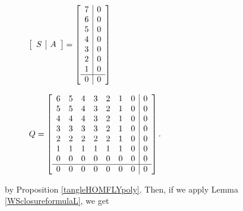 \documentclass[11pt]{amsart}
\theoremstyle{plain}
\theoremstyle{definition}
\theoremstyle{remark}
\begin{document}
  \begin{figure}[H]
    \centering
\begin{minipage}[b]{.45\textwidth}

$\left[\begin{array}{ c | c }
   S & A \end{array}\right] =
  \left[\begin{array}{ c | c }
    7 & 0 \\
    6 & 0 \\
    5 & 0 \\
    4 & 0 \\
    3 & 0 \\
    2 & 0 \\
    1 & 0 \\
    \hline
    0 & 0 \\
   \end{array}\right]$
    \end{minipage}
    \begin{minipage}[b]{.45\textwidth}
    $ Q=\left[\begin{array}{ c c c c c c c | c }
    6 & 5 & 4 & 3 & 2 & 1 & 0 & 0\\
    5 & 5 & 4 & 3 & 2 & 1 & 0 & 0\\
    4 & 4 & 4 & 3 & 2 & 1 & 0 & 0\\
    3 & 3 & 3 & 3 & 2 & 1 & 0 & 0\\
    2 & 2 & 2 & 2 & 2 & 1 & 0 & 0\\
    1 & 1 & 1 & 1 & 1 & 1 & 0 & 0\\
    0 & 0 & 0 & 0 & 0 & 0 & 0 & 0\\
    \hline
    0 & 0 & 0 & 0 & 0 & 0 & 0 & 0
    \end{array}\right].$
    \end{minipage}
\end{figure}

by Proposition \ref{tangleHOMFLYpoly}. Then, if we apply Lemma \ref{WSclosureformulaL}, we get
\end{document}
